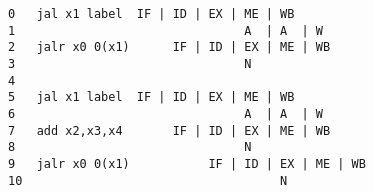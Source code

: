 \documentclass[varwidth, convert]{standalone}
\begin{document}
  \begin{BVerbatim}[]
0   jal x1 label  IF | ID | EX | ME | WB
1                                A  | A  | W
2   jalr x0 0(x1)      IF | ID | EX | ME | WB
3                                N
4
5   jal x1 label  IF | ID | EX | ME | WB
6                                A  | A  | W
7   add x2,x3,x4       IF | ID | EX | ME | WB
8                                N
9   jalr x0 0(x1)           IF | ID | EX | ME | WB
10                                    N
  \end{BVerbatim}
\end{document}
